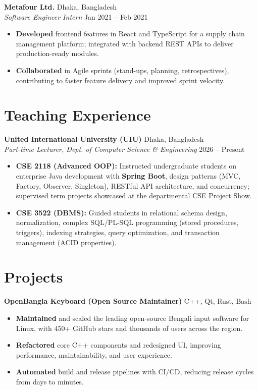 \documentclass[10pt,a4paper]{article}
\begin{document}
\vspace{6pt}
\noindent
\textbf{Metafour Ltd.} \hfill Dhaka, Bangladesh \\
\textit{Software Engineer Intern} \hfill Jan 2021 -- Feb 2021
\begin{itemize}
    \item \textbf{Developed} frontend features in React and TypeScript for a supply chain management platform; integrated with backend REST APIs to deliver production-ready modules.
    \item \textbf{Collaborated} in Agile sprints (stand-ups, planning, retrospectives), contributing to faster feature delivery and improved sprint velocity.
\end{itemize}

\section*{Teaching Experience}

\textbf{United International University (UIU)} \hfill Dhaka, Bangladesh \\
\textit{Part-time Lecturer, Dept. of Computer Science \& Engineering} \hfill 2026 -- Present
\begin{itemize}
    \item \textbf{CSE 2118 (Advanced OOP):} Instructed undergraduate students on enterprise Java development with \textbf{Spring Boot}, design patterns (MVC, Factory, Observer, Singleton), RESTful API architecture, and concurrency; supervised term projects showcased at the departmental CSE Project Show.
    \item \textbf{CSE 3522 (DBMS):} Guided students in relational schema design, normalization, complex SQL/PL-SQL programming (stored procedures, triggers), indexing strategies, query optimization, and transaction management (ACID properties).
\end{itemize}

\section*{Projects}
\textbf{OpenBangla Keyboard (Open Source Maintainer)} \hfill C++, Qt, Rust, Bash \\
\begin{itemize}
    \item \textbf{Maintained} and scaled the leading open-source Bengali input software for Linux, with 450+ GitHub stars and thousands of users across the region.
    \item \textbf{Refactored} core C++ components and redesigned UI, improving performance, maintainability, and user experience.
    \item \textbf{Automated} build and release pipelines with CI/CD, reducing release cycles from days to minutes.
\end{itemize}
\end{document}
